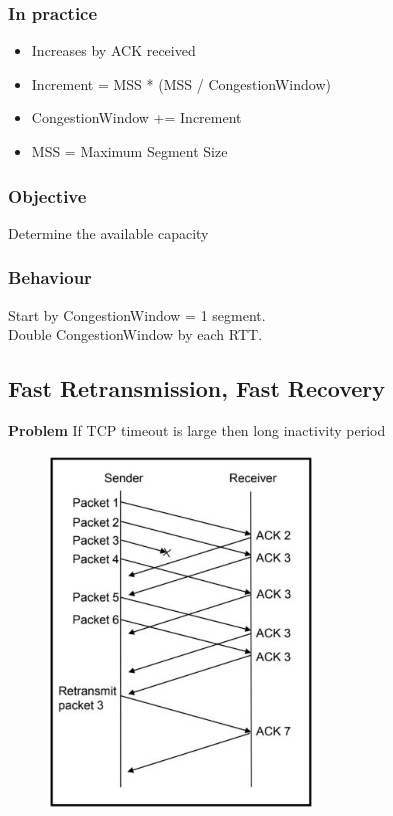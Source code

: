 \documentclass[../resumosRCOM.tex]{subfiles}
\begin{document}
\subsubsection{In practice}
\begin{itemize}
    \item Increases by ACK received
    \item Increment = MSS * (MSS / CongestionWindow)
    \item CongestionWindow += Increment
    \item MSS = Maximum Segment Size
\end{itemize}

\subsubsection{Objective}
Determine the available capacity

\subsubsection{Behaviour}
Start by CongestionWindow = 1 segment. \\
Double CongestionWindow by each RTT.\\

\subsection{Fast Retransmission, Fast Recovery}
\textbf{Problem}
If TCP timeout is large then long inactivity period
\begin{figure}[h]
    \centering
    \includegraphics[width=7cm]{images/trans12.JPG}
\end{figure}
\end{document}
